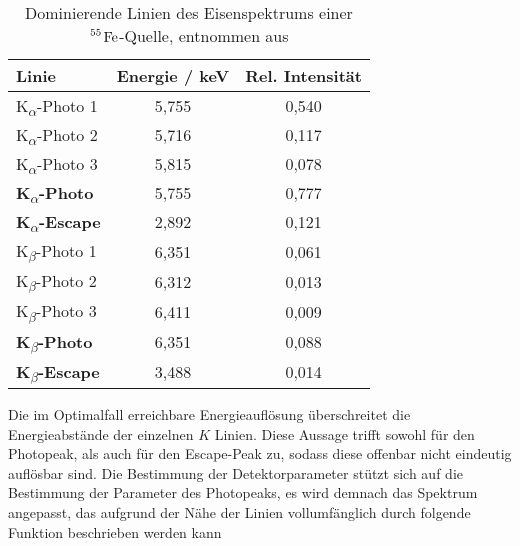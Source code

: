 			\begin{table}[h!]
				\centering
				\begin{tabular}{|l|c|c|}
					\hline
					\textbf{Linie} & \textbf{Energie / keV} & \textbf{Rel. Intensität} \\ \hline
					K\textsubscript{$\alpha$}-Photo 1    & 5,755         & 0,540           \\ \hline
					K\textsubscript{$\alpha$}-Photo 2    & 5,716         & 0,117           \\ \hline
					K\textsubscript{$\alpha$}-Photo 3    & 5,815         & 0,078           \\ \hline
					\textbf{K\textsubscript{$\alpha$}-Photo}  & 5,755         & 0,777           \\ \hline
					\textbf{K\textsubscript{$\alpha$}-Escape} & 2,892         & 0,121           \\ \hline
					K\textsubscript{$\beta$}-Photo 1     & 6,351         & 0,061           \\ \hline
					K\textsubscript{$\beta$}-Photo 2     & 6,312         & 0,013           \\ \hline
					K\textsubscript{$\beta$}-Photo 3     & 6,411         & 0,009           \\ \hline
					\textbf{K\textsubscript{$\beta$}-Photo}  & 6,351         & 0,088           \\ \hline
					\textbf{K\textsubscript{$\beta$}-Escape} & 3,488         & 0,014           \\ \hline
				\end{tabular}
				\caption{Dominierende Linien des Eisenspektrums einer $\ce{^55 Fe}$-Quelle, entnommen aus \cite{ottnad}}
				\label{tab:Eisenlinien}
			\end{table}
			
			
			\noindent Die im Optimalfall erreichbare Energieauflösung überschreitet die Energieabstände der einzelnen $K$ Linien. Diese Aussage trifft sowohl für den Photopeak, als auch für den Escape-Peak zu, sodass diese offenbar nicht eindeutig auflösbar sind. Die Bestimmung der Detektorparameter stützt sich auf die Bestimmung der Parameter des Photopeaks, es wird demnach das Spektrum angepasst, das aufgrund der Nähe der Linien vollumfänglich durch folgende Funktion beschrieben werden kann \cite{Hauer}
			 

			
			
			
			
